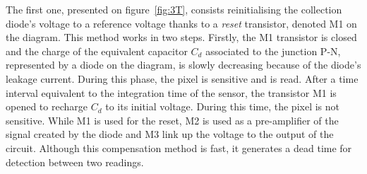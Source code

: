     The first one, presented on figure~\ref{fig:3T}, consists reinitialising the collection diode's voltage to a reference voltage thanks to a \textit{reset} transistor, denoted M1 on the diagram.
    This method works in two steps. 
    Firstly, the M1 transistor is closed and the charge of the equivalent capacitor $C_d$ associated to the junction P-N, represented by a diode on the diagram, is slowly decreasing because of the diode's leakage current. 
    During this phase, the pixel is sensitive and is read.
    After a time interval equivalent to the integration time of the sensor, the transistor M1 is opened to recharge $C_d$ to its initial voltage.
    During this time, the pixel is not sensitive.
    While M1 is used for the reset, M2 is used as a pre-amplifier of the signal created by the diode and M3 link up the voltage to the output of the circuit.
    Although this compensation method is fast, it generates a dead time for detection between two readings.
    
    
